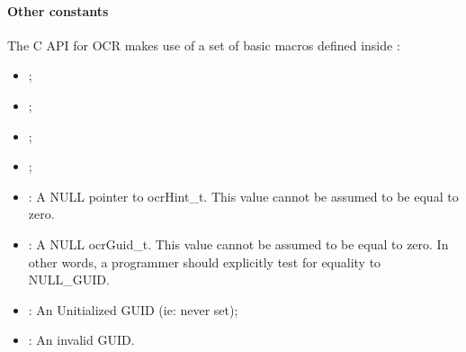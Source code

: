 \paragraph*{Other constants}
The C API for OCR makes use of a set of basic macros defined
inside :
\begin{itemize}
\item {};
\item {};
\item {};
\item {};
\item {}: A NULL pointer to ocrHint\_t. This value cannot
  be assumed to be equal to zero.
\item {}: A NULL ocrGuid\_t. This value cannot
  be assumed to be equal to zero. In other words, a programmer should
  explicitly test for equality to NULL\_GUID.
\item {}: An Unitialized GUID (ie: never set);
\item {}: An invalid GUID.
\end{itemize}
